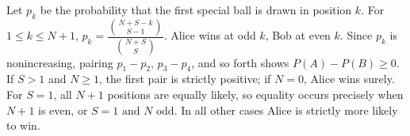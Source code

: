 Let $p_k$ be the probability that the first special ball is drawn in position $k$. For $1\le k\le N+1$, $p_k=\dfrac{\binom{N+S-k}{S-1}}{\binom{N+S}{S}}$. Alice wins at odd $k$, Bob at even $k$. Since $p_k$ is nonincreasing, pairing $p_1-p_2$, $p_3-p_4$, and so forth shows $P(A)-P(B)\ge 0$. If $S>1$ and $N\ge 1$, the first pair is strictly positive; if $N=0$, Alice wins surely. For $S=1$, all $N+1$ positions are equally likely, so equality occurs precisely when $N+1$ is even, or $\boxed{S=1\text{ and }N\text{ odd}}$. In all other cases Alice is strictly more likely to win.
